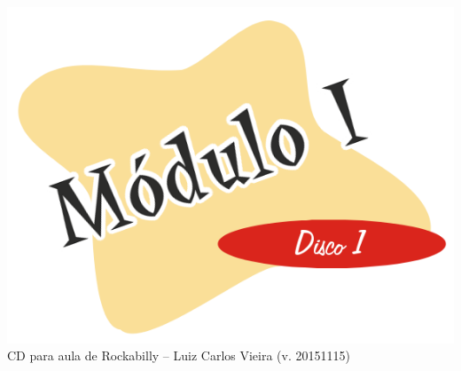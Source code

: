 \documentclass{article}
\begin{document}
\begin{minipage}[t][0.95\textheight][c]{0.477\textwidth}
    \centering
    \vspace{0.1cm}
    \includegraphics[width=\textwidth]{m1d1.png}
    {\tiny CD para aula de Rockabilly -- Luiz Carlos Vieira (v. 20151115)}
\end{minipage}

\newpage
\end{document}

